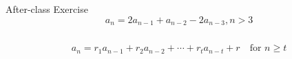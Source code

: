 \begin{frame}{}
  \begin{exampleblock}{After-class Exercise}
    \[
      a_n = 2a_{n-1} + a_{n-2} - 2a_{n-3}, n > 3
    \]
  \end{exampleblock}

  \begin{columns}
    \pause
  \end{columns}
\end{frame}

\begin{frame}{}
  \centerline{}

  \[
    a_n = r_1 a_{n-1} + r_2 a_{n-2} + \cdots + r_t a_{n-t} + r \quad \text{for } n \ge t
  \]
\end{frame}

